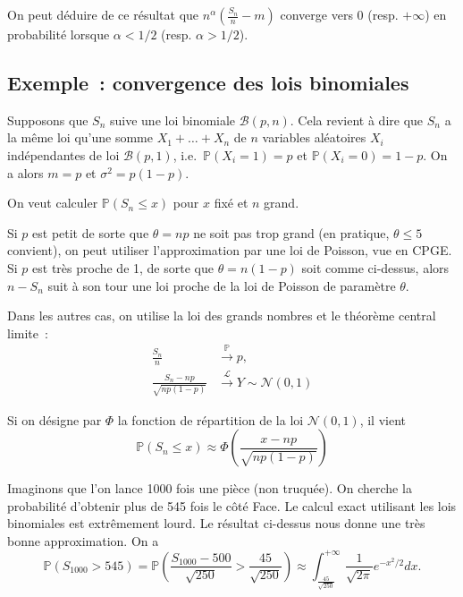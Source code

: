 \begin{remarque}[{Conséquence}]\label{IV-consuxe9quence}

On peut déduire de ce résultat que \(n^\alpha (\frac{S_n}{n} - m)\)
converge vers 0 (resp. \(+\infty\)) en probabilité lorsque
\(\alpha < 1/2\) (resp. \(\alpha > 1/2\)).
\end{remarque}

\subsection*{Exemple~: convergence des lois
binomiales}\label{IV-exemple-convergence-des-lois-binomiales}

Supposons que \(S_n\) suive une loi binomiale \(\mathcal{B}(p,n)\). Cela
revient à dire que \(S_n\) a la même loi qu'une somme \(X_1+\ldots+X_n\)
de \(n\) variables aléatoires \(X_i\) indépendantes de loi
\(\mathcal{B}(p,1)\), i.e.~\(\mathbb{P}(X_i= 1) = p\) et
\(\mathbb{P}(X_i= 0) = 1- p\). On a alors \(m=p\) et
\(\sigma^2= p(1-p)\).

On veut calculer \(\mathbb{P}(S_n \leq x)\) pour \(x\) fixé et \(n\)
grand.

Si \(p\) est petit de sorte que \(\theta = np\) ne soit pas trop grand
(en pratique, \(\theta \leq 5\) convient), on peut utiliser
l'approximation par une loi de Poisson, vue en CPGE. Si \(p\) est très
proche de 1, de sorte que \(\theta = n(1 - p)\) soit comme ci-dessus,
alors \(n - S_n\) suit à son tour une loi proche de la loi de Poisson de
paramètre \(\theta\).

Dans les autres cas, on utilise la loi des grands nombres et le théorème
central limite~: \begin{align*}
\frac{S_n}{n} & \xrightarrow{\mathbb{P}} p,\\
\frac{S_n - np}{\sqrt{n p(1-p)}} & \xrightarrow{\mathcal{L}} Y \sim \mathcal{N}(0,1)
\end{align*}

Si on désigne par \(\Phi\) la fonction de répartition de la loi
\(\mathcal{N}(0,1)\), il vient
\[\mathbb{P}(S_n \leq x) \approx \Phi \left(\frac{x - np}{\sqrt{n p(1-p)}}\right)\]

Imaginons que l'on lance 1000 fois une pièce (non truquée). On cherche
la probabilité d'obtenir plus de 545 fois le côté Face. Le calcul exact
utilisant les lois binomiales est extrêmement lourd. Le résultat
ci-dessus nous donne une très bonne approximation. On a
\[ \mathbb{P}(S_{1000} > 545) = \mathbb{P}\left(\frac{S_{1000} - 500}{\sqrt{250}} > \frac{45}{\sqrt{250}}\right) \approx \int_{\frac{45}{\sqrt{250}}}^{+\infty} \frac{1}{\sqrt{2\pi}} e^{-x^2/2} dx.\]

